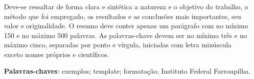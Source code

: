 \begin{resumo}
Deve-se ressaltar de forma clara e sintética a natureza e o objetivo do trabalho, o método que foi empregado, os resultados e as conclusões mais importantes, seu valor e originalidade. O resumo deve conter apenas um parágrafo com no mínimo 150 e no máximo 500 palavras. As palavras-chave devem ser no mínimo três e no máximo cinco, separadas por ponto e vírgula, iniciadas com letra minúscula exceto nomes próprios e científicos.
\vspace{\onelineskip}
\noindent

\textbf{Palavras-chaves}: exemplos; template; formatação; Instituto Federal Farroupilha.
\end{resumo}